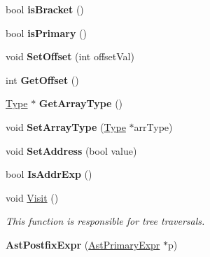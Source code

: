\begin{DoxyCompactItemize}
\item 
\hypertarget{classAstPostfixExpr_ab64abc6d0d53ab829374044d929bcf32}{bool {\bfseries is\-Bracket} ()}\label{classAstPostfixExpr_ab64abc6d0d53ab829374044d929bcf32}

\item 
\hypertarget{classAstPostfixExpr_a845e15af7d9d4cadae2732f6ad7e1e0c}{bool {\bfseries is\-Primary} ()}\label{classAstPostfixExpr_a845e15af7d9d4cadae2732f6ad7e1e0c}

\item 
\hypertarget{classAstPostfixExpr_aed796a3e3aa675b56f3418bf20656a45}{void {\bfseries Set\-Offset} (int offset\-Val)}\label{classAstPostfixExpr_aed796a3e3aa675b56f3418bf20656a45}

\item 
\hypertarget{classAstPostfixExpr_a73527573548a64455b1ff7f7c3e3af83}{int {\bfseries Get\-Offset} ()}\label{classAstPostfixExpr_a73527573548a64455b1ff7f7c3e3af83}

\item 
\hypertarget{classAstPostfixExpr_aa57ee270d53c864251a58b33932e8b93}{\hyperlink{classType}{Type} $\ast$ {\bfseries Get\-Array\-Type} ()}\label{classAstPostfixExpr_aa57ee270d53c864251a58b33932e8b93}

\item 
\hypertarget{classAstPostfixExpr_aa5d70d77be68a21aa2f30a6c276e7453}{void {\bfseries Set\-Array\-Type} (\hyperlink{classType}{Type} $\ast$arr\-Type)}\label{classAstPostfixExpr_aa5d70d77be68a21aa2f30a6c276e7453}

\item 
\hypertarget{classAstPostfixExpr_a8999a89a30f416241a29e7f8b8b0e948}{void {\bfseries Set\-Address} (bool value)}\label{classAstPostfixExpr_a8999a89a30f416241a29e7f8b8b0e948}

\item 
\hypertarget{classAstPostfixExpr_a84889c2ddd3eabd0966e08f85a2576c4}{bool {\bfseries Is\-Addr\-Exp} ()}\label{classAstPostfixExpr_a84889c2ddd3eabd0966e08f85a2576c4}

\item 
void \hyperlink{classAstPostfixExpr_ae3e7fdbd4c2bf888ee62760e6f422cad}{Visit} ()
\begin{DoxyCompactList}\small\item\em This function is responsible for tree traversals. \end{DoxyCompactList}\item 
\hypertarget{classAstPostfixExpr_a8299517f87239b0428545cdfc96f0bbc}{{\bfseries Ast\-Postfix\-Expr} (\hyperlink{classAstPrimaryExpr}{Ast\-Primary\-Expr} $\ast$p)}\label{classAstPostfixExpr_a8299517f87239b0428545cdfc96f0bbc}


\end{DoxyCompactItemize}
